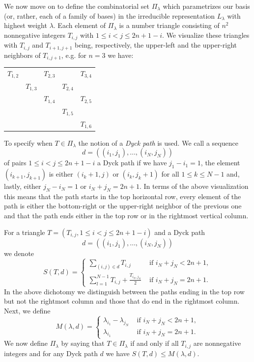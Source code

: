 \documentclass[10pt,a4paper]{article}
\theoremstyle{remark}\newtheorem{rema}[theo]{Remark}
\newcommand{\la}{\lambda}
\begin{document}
We now move on to define the combinatorial set $\Pi_\lambda$ which parametrizes our basis (or, rather, each of a family of bases) in the irreducible representation $L_\la$ with highest weight $\la$. Each element of $\Pi_\la$ is a number triangle consisting of $n^2$ nonnegative integers $T_{i,j}$ with $1\le i<j \le 2n+1-i$. We visualize these triangles with $T_{i,j}$ and $T_{i+1,j+1}$ being, respectively, the upper-left and the upper-right neighbors of $T_{i,j+1}$, e.g. for $n=3$ we have:
\begin{center}
\begin{tabular}{ccccc}
$T_{1,2}$ && $T_{2,3}$ && $T_{3,4}$\\
&$T_{1,3}$ && $T_{2,4}$ & \\
&& $T_{1,4}$ && $T_{2,5}$ \\
&&& $T_{1,5}$ &\\
&&&& $T_{1,6}$
\end{tabular}
\end{center}
\vspace{2ex}

To specify when $T\in\Pi_\lambda$ the notion of a \emph{Dyck path} is used. We call a sequence
\[
d=((i_1,j_1),\dots,(i_N,j_N))
\]
of pairs $1\le i<j \le 2n+1-i$ a Dyck path if we have $j_1-i_1=1$, the element $(i_{k+1},j_{k+1})$ is either $(i_k+1,j)$ or $(i_k,j_k+1)$ for all $1\le k\le N-1$ and, lastly, either $j_N-i_N=1$ or $i_N+j_N=2n+1$. In terms of the above visualization this means that the path starts in the top horizontal row, every element of the path is either the bottom-right or the upper-right neighbor of the previous one and that the path ends either in the top row or in the rightmost vertical column.

For a triangle $T=(T_{i,j}, 1\le i<j \le 2n+1-i)$ and a Dyck path
\[
d=((i_1,j_1),\dots,(i_N,j_N))
\]
we denote
\[
S(T,d)=
\begin{cases}
\sum\limits_{(i,j)\in d} T_{i,j}&\text{ if }i_N+j_N<2n+1,\\[10pt]
\sum\limits_{l=1}^{N-1} T_{i,j}+\frac{T_{i_N,j_N}}2&\text{ if }i_N+j_N=2n+1.
\end{cases}
\]
In the above dichotomy we distinguish between the paths ending in the top row but not the rightmost column and those that do end in the rightmost column. Next, we define
\[
M(\lambda,d)=
\begin{cases}
\la_{i_1}-\la_{j_N}&\text{ if }i_N+j_N<2n+1,\\
\la_{i_1}&\text{ if }i_N+j_N=2n+1.
\end{cases}
\]
We now define $\Pi_\lambda$ by saying that $T\in\Pi_\lambda$ if and only if all $T_{i,j}$ are nonnegative integers and for any Dyck path $d$ we have $S(T,d)\le M(\lambda,d)$.
\end{document}

